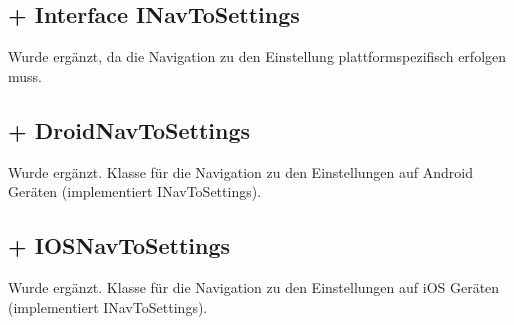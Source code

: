\documentclass[../implementierung.tex]{subfiles}
\begin{document}
\subsection{+ Interface INavToSettings}
Wurde ergänzt, da die Navigation zu den Einstellung plattformspezifisch erfolgen muss.
\begin{itemize}
\end{itemize}
\subsection{+ DroidNavToSettings}
Wurde ergänzt. Klasse für die Navigation zu den Einstellungen auf Android Geräten (implementiert INavToSettings).
\subsection{+ IOSNavToSettings}
Wurde ergänzt. Klasse für die Navigation zu den Einstellungen auf iOS Geräten (implementiert INavToSettings).
\end{document}
